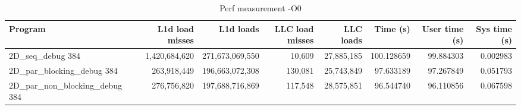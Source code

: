\begin{table}[H]
\tiny
\centering
\begin{tabular}{|l|r|r|r|r|r|r|r|}
\hline
Program & L1d load misses & L1d loads & LLC load misses & LLC loads & Time (s) & User time (s) & Sys time (s) \\ \hline
2D\_seq\_debug 384 & 1,420,684,620 & 271,673,069,550 & 10,609 & 27,885,185 & 100.128659 & 99.884303 & 0.002983 \\ \hline
2D\_par\_blocking\_debug 384 & 263,918,449 & 196,663,072,308 & 130,081 & 25,743,849 & 97.633189 & 97.267849 & 0.051793 \\ \hline
2D\_par\_non\_blocking\_debug 384 & 276,756,820 & 197,688,716,869 & 117,548 & 28,575,851 & 96.544740 & 96.110856 & 0.067598 \\ \hline
\end{tabular}
\caption{Perf measurement -O0}
\label{table:perf1}
\end{table}
